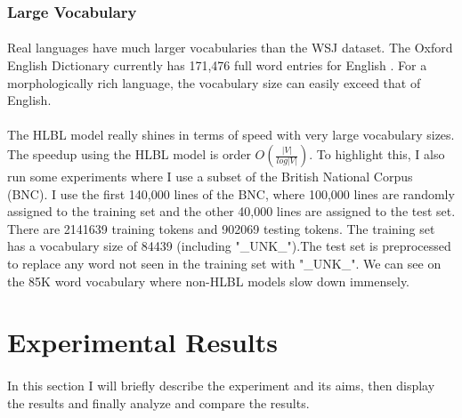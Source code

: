 \subsubsection{Large Vocabulary}
\paragraph{}
Real languages have much larger vocabularies than the WSJ dataset. The Oxford English Dictionary currently has 171,476 full word entries for English \cite{OED}. For a morphologically rich language, the vocabulary size can easily exceed that of English.
\paragraph{}
The HLBL model really shines in terms of speed with very large vocabulary sizes. The speedup using the HLBL model is order $O(\frac{|V|}{log|V|})$. To highlight this, I also run some experiments where I use a subset of the British National Corpus (BNC). I use the first 140,000 lines of the BNC, where 100,000 lines are randomly assigned to the training set and the other 40,000 lines are assigned to the test set. There are 2141639 training tokens and 902069 testing tokens. The training set has a vocabulary size of 84439 (including "\_UNK\_").The test set is preprocessed to replace any word not seen in the training set with "\_UNK\_". We can see on the 85K word vocabulary where non-HLBL models slow down immensely.




\section{Experimental Results}
\paragraph{}
In this section I will briefly describe the experiment and its aims, then display the results and finally analyze and compare the results.

